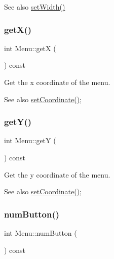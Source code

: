 \begin{DoxySeeAlso}{See also}
\mbox{\hyperlink{class_menu_af6f5271f0f4546168c00467734ab7cd1}{set\+Width()}} 
\end{DoxySeeAlso}
\mbox{\label{class_menu_a75345bb25315b3cbcc98ad276e043f4d}} 
\subsubsection{\texorpdfstring{get\+X()}{getX()}}
{\footnotesize\ttfamily int Menu\+::getX (\begin{DoxyParamCaption}{ }\end{DoxyParamCaption}) const}



Get the x coordinate of the menu. 

\begin{DoxySeeAlso}{See also}
\mbox{\hyperlink{class_menu_a27d7e75ca0a6d80e9a8c299d858f5dc3}{set\+Coordinate()}}; 
\end{DoxySeeAlso}
\mbox{\label{class_menu_a2daa248a3bc22bfbd0931337ea8299ae}} 
\subsubsection{\texorpdfstring{get\+Y()}{getY()}}
{\footnotesize\ttfamily int Menu\+::getY (\begin{DoxyParamCaption}{ }\end{DoxyParamCaption}) const}



Get the y coordinate of the menu. 

\begin{DoxySeeAlso}{See also}
\mbox{\hyperlink{class_menu_a27d7e75ca0a6d80e9a8c299d858f5dc3}{set\+Coordinate()}}; 
\end{DoxySeeAlso}
\mbox{\label{class_menu_aa0878bc89af6cb4b96132966af62b1e0}} 
\subsubsection{\texorpdfstring{num\+Button()}{numButton()}}
{\footnotesize\ttfamily int Menu\+::num\+Button (\begin{DoxyParamCaption}{ }\end{DoxyParamCaption}) const}



